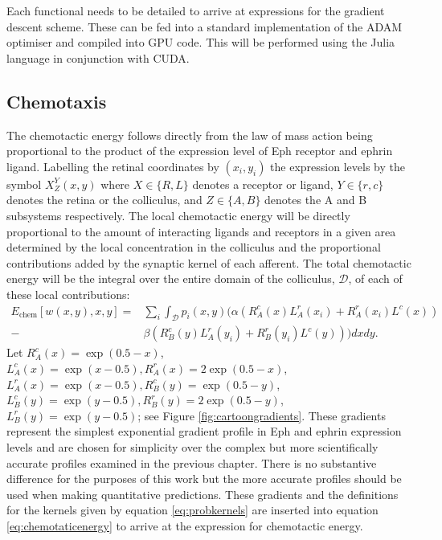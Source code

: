 Each functional needs to be detailed to arrive at expressions for the gradient descent scheme. These can be fed into a standard implementation of the ADAM optimiser and compiled into GPU code. This will be performed using the Julia language in conjunction with CUDA.
\subsection{Chemotaxis}
The chemotactic energy follows directly from the law of mass action being proportional to the product of the expression level of Eph receptor and ephrin ligand. Labelling the retinal coordinates by $(x_i, y_i)$ the expression levels by the symbol $X_Z^Y(x, y)$ where $X \in \{R, L\}$ denotes a receptor or ligand, $ Y \in \{r, c\}$ denotes the retina or the colliculus, and $Z \in \{A, B\}$ denotes the A and B subsystems respectively. The local chemotactic energy will be directly proportional to the amount of interacting ligands and receptors in a given area determined by the local concentration in the colliculus and the proportional contributions added by the synaptic kernel of each afferent. The total chemotactic energy will be the integral over the entire domain of the colliculus, $\mathcal{D}$, of each of these local contributions:
\begin{align} \label{eq:chemotaticenergy}
	E_\text{chem}[w(x, y), x, y] = &\sum_i \int_{\mathcal{D}} p_i(x, y) (\alpha(R^c_A(x)L^r_A(x_i) + R^r_A(x_i)L^c(x)) \\ - &\beta(R^c_B(y)L^r_A(y_i) + R^r_B(y_i)L^c(y)))dxdy.
\end{align}
Let $R^c_A(x) = \exp(0.5 - x)$, $L^c_A(x) = \exp(x - 0.5), R^r_A(x) = 2\exp(0.5 - x)$, $L^r_A(x) = \exp(x - 0.5),  R^c_B(y) = \exp(0.5 - y)$, $L^c_B(y) = \exp(y - 0.5), R^r_B(y) = 2\exp(0.5 - y)$, $L^r_B(y) = \exp(y - 0.5)$; see Figure \ref{fig:cartoongradients}. These gradients represent the simplest exponential gradient profile in Eph and ephrin expression levels and are chosen for simplicity over the complex but more scientifically accurate profiles examined in the previous chapter. There is no substantive difference for the purposes of this work but the more accurate profiles should be used when making quantitative predictions. These gradients and the definitions for the kernels given by equation \ref{eq:probkernels} are inserted into equation \ref{eq:chemotaticenergy} to arrive at the expression for chemotactic energy. 
